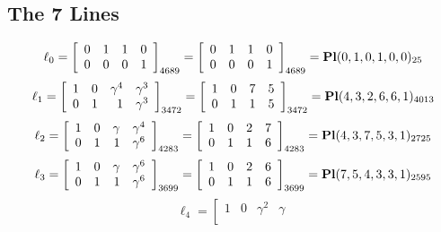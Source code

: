 \documentclass{article}
\begin{document}
{\subsection*{The 7 Lines}
$$
\ell_{0} = 
\left[
\begin{array}{*{4}{r}}
0 & 1 & 1 & 0\\
0 & 0 & 0 & 1\\
\end{array}
\right]
_{4689}
=
\left[
\begin{array}{*{4}c}
0  & 1  & 1  & 0\\
0  & 0  & 0  & 1\\
\end{array}
\right]_{4689}
={\rm\bf Pl}(0,1,0,1,0,0 )_{25}$$
$$
\ell_{1} = 
\left[
\begin{array}{*{4}{r}}
1 & 0 & \gamma^{4} & \gamma^{3}\\
0 & 1 & 1 & \gamma^{3}\\
\end{array}
\right]
_{3472}
=
\left[
\begin{array}{*{4}c}
1  & 0  & 7  & 5\\
0  & 1  & 1  & 5\\
\end{array}
\right]_{3472}
={\rm\bf Pl}(4,3,2,6,6,1 )_{4013}$$
$$
\ell_{2} = 
\left[
\begin{array}{*{4}{r}}
1 & 0 & \gamma  & \gamma^{4}\\
0 & 1 & 1 & \gamma^{6}\\
\end{array}
\right]
_{4283}
=
\left[
\begin{array}{*{4}c}
1  & 0  & 2  & 7\\
0  & 1  & 1  & 6\\
\end{array}
\right]_{4283}
={\rm\bf Pl}(4,3,7,5,3,1 )_{2725}$$
$$
\ell_{3} = 
\left[
\begin{array}{*{4}{r}}
1 & 0 & \gamma  & \gamma^{6}\\
0 & 1 & 1 & \gamma^{6}\\
\end{array}
\right]
_{3699}
=
\left[
\begin{array}{*{4}c}
1  & 0  & 2  & 6\\
0  & 1  & 1  & 6\\
\end{array}
\right]_{3699}
={\rm\bf Pl}(7,5,4,3,3,1 )_{2595}$$
$$
\ell_{4} = 
\left[
\begin{array}{*{4}{r}}
1 & 0 & \gamma^{2} & \gamma \\

\end{array}$$}
\end{document}
